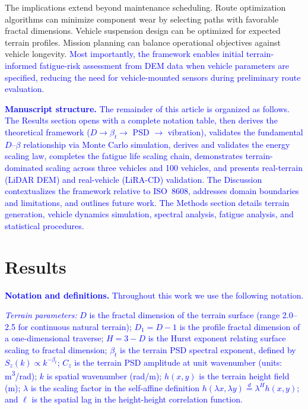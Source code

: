 \documentclass[11pt]{article}
\begin{document}
The implications extend beyond maintenance scheduling. Route optimization algorithms can minimize component wear by selecting paths with favorable fractal dimensions. Vehicle suspension design can be optimized for expected terrain profiles. Mission planning can balance operational objectives against vehicle longevity. \textcolor{blue}{Most importantly, the framework enables initial terrain-informed fatigue-risk assessment from DEM data when vehicle parameters are specified, reducing the need for vehicle-mounted sensors during preliminary route evaluation.}

\textcolor{blue}{\textbf{Manuscript structure.} The remainder of this article is organized as follows. The Results section opens with a complete notation table, then derives the theoretical framework ($D \rightarrow \beta_t \rightarrow$ PSD $\rightarrow$ vibration), validates the fundamental $D$--$\beta$ relationship via Monte Carlo simulation, derives and validates the energy scaling law, completes the fatigue life scaling chain, demonstrates terrain-dominated scaling across three vehicles and 100 vehicles, and presents real-terrain (LiDAR DEM) and real-vehicle (LiRA-CD) validation. The Discussion contextualizes the framework relative to ISO~8608, addresses domain boundaries and limitations, and outlines future work. The Methods section details terrain generation, vehicle dynamics simulation, spectral analysis, fatigue analysis, and statistical procedures.}


\section*{Results}

\textcolor{blue}{\textbf{Notation and definitions.} Throughout this work we use the following notation.}

\textcolor{blue}{\textit{Terrain parameters:} $D$ is the fractal dimension of the terrain surface (range 2.0--2.5 for continuous natural terrain); $D_1 = D - 1$ is the profile fractal dimension of a one-dimensional traverse; $H = 3-D$ is the Hurst exponent relating surface scaling to fractal dimension; $\beta_t$ is the terrain PSD spectral exponent, defined by $S_z(k) \propto k^{-\beta_t}$; $C_z$ is the terrain PSD amplitude at unit wavenumber (units: m\textsuperscript{3}/rad); $k$ is spatial wavenumber (rad/m); $h(x,y)$ is the terrain height field (m); $\lambda$ is the scaling factor in the self-affine definition $h(\lambda x, \lambda y) \overset{d}{=} \lambda^H h(x,y)$; and $\ell$ is the spatial lag in the height-height correlation function.}
\end{document}

